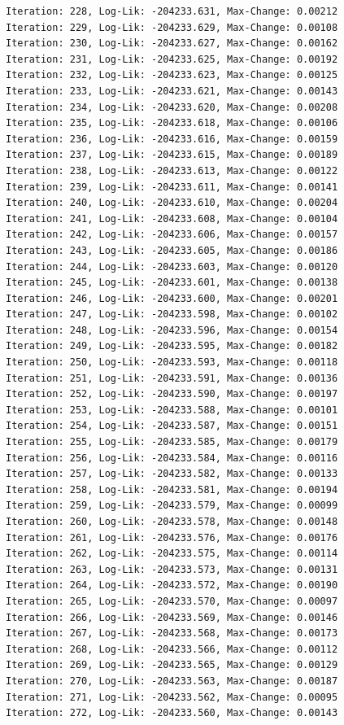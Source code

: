 \documentclass[
  letterpaper,
  DIV=11,
  numbers=noendperiod]{scrreport}
\begin{document}
\begin{verbatim}
Iteration: 228, Log-Lik: -204233.631, Max-Change: 0.00212
Iteration: 229, Log-Lik: -204233.629, Max-Change: 0.00108
Iteration: 230, Log-Lik: -204233.627, Max-Change: 0.00162
Iteration: 231, Log-Lik: -204233.625, Max-Change: 0.00192
Iteration: 232, Log-Lik: -204233.623, Max-Change: 0.00125
Iteration: 233, Log-Lik: -204233.621, Max-Change: 0.00143
Iteration: 234, Log-Lik: -204233.620, Max-Change: 0.00208
Iteration: 235, Log-Lik: -204233.618, Max-Change: 0.00106
Iteration: 236, Log-Lik: -204233.616, Max-Change: 0.00159
Iteration: 237, Log-Lik: -204233.615, Max-Change: 0.00189
Iteration: 238, Log-Lik: -204233.613, Max-Change: 0.00122
Iteration: 239, Log-Lik: -204233.611, Max-Change: 0.00141
Iteration: 240, Log-Lik: -204233.610, Max-Change: 0.00204
Iteration: 241, Log-Lik: -204233.608, Max-Change: 0.00104
Iteration: 242, Log-Lik: -204233.606, Max-Change: 0.00157
Iteration: 243, Log-Lik: -204233.605, Max-Change: 0.00186
Iteration: 244, Log-Lik: -204233.603, Max-Change: 0.00120
Iteration: 245, Log-Lik: -204233.601, Max-Change: 0.00138
Iteration: 246, Log-Lik: -204233.600, Max-Change: 0.00201
Iteration: 247, Log-Lik: -204233.598, Max-Change: 0.00102
Iteration: 248, Log-Lik: -204233.596, Max-Change: 0.00154
Iteration: 249, Log-Lik: -204233.595, Max-Change: 0.00182
Iteration: 250, Log-Lik: -204233.593, Max-Change: 0.00118
Iteration: 251, Log-Lik: -204233.591, Max-Change: 0.00136
Iteration: 252, Log-Lik: -204233.590, Max-Change: 0.00197
Iteration: 253, Log-Lik: -204233.588, Max-Change: 0.00101
Iteration: 254, Log-Lik: -204233.587, Max-Change: 0.00151
Iteration: 255, Log-Lik: -204233.585, Max-Change: 0.00179
Iteration: 256, Log-Lik: -204233.584, Max-Change: 0.00116
Iteration: 257, Log-Lik: -204233.582, Max-Change: 0.00133
Iteration: 258, Log-Lik: -204233.581, Max-Change: 0.00194
Iteration: 259, Log-Lik: -204233.579, Max-Change: 0.00099
Iteration: 260, Log-Lik: -204233.578, Max-Change: 0.00148
Iteration: 261, Log-Lik: -204233.576, Max-Change: 0.00176
Iteration: 262, Log-Lik: -204233.575, Max-Change: 0.00114
Iteration: 263, Log-Lik: -204233.573, Max-Change: 0.00131
Iteration: 264, Log-Lik: -204233.572, Max-Change: 0.00190
Iteration: 265, Log-Lik: -204233.570, Max-Change: 0.00097
Iteration: 266, Log-Lik: -204233.569, Max-Change: 0.00146
Iteration: 267, Log-Lik: -204233.568, Max-Change: 0.00173
Iteration: 268, Log-Lik: -204233.566, Max-Change: 0.00112
Iteration: 269, Log-Lik: -204233.565, Max-Change: 0.00129
Iteration: 270, Log-Lik: -204233.563, Max-Change: 0.00187
Iteration: 271, Log-Lik: -204233.562, Max-Change: 0.00095
Iteration: 272, Log-Lik: -204233.560, Max-Change: 0.00143

\end{verbatim}
\end{document}
